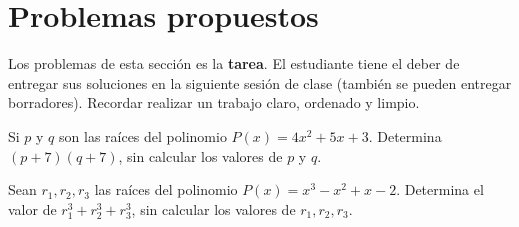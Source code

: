 \section{Problemas propuestos}

Los problemas de esta sección es la \textbf{tarea}.
El estudiante tiene el deber de entregar sus soluciones en la siguiente sesión de clase (también se pueden entregar borradores).
Recordar realizar un trabajo claro, ordenado y limpio.

\showLine
\begin{multicols}{2}
    \begin{problem}
        Si $p$ y $q$ son las raíces del polinomio $P(x) = 4x^2 + 5x + 3$.
        Determina $(p + 7)(q + 7)$, sin calcular los valores de $p$ y $q$.
    \end{problem}

    \begin{problem}
        Sean $r_1, r_2, r_3$ las raíces del polinomio $P(x) = x^3 - x^2 + x - 2$.
        Determina el valor de $r^3_1 + r^3_2 + r^3_3$, sin calcular los valores de $r_1, r_2, r_3$.
    \end{problem}
\end{multicols}
